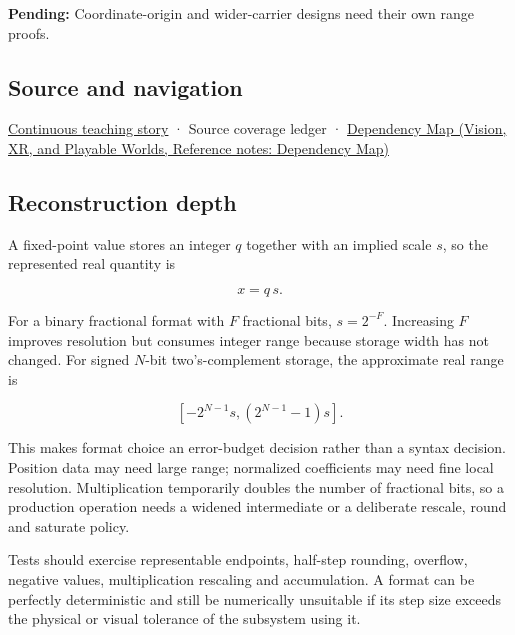 \textbf{Pending:} Coordinate-origin and wider-carrier designs need their own range proofs.

\subsection{Source and navigation}\label{appendix-ceb4c4a9b5a1-source-and-navigation}

\hyperref[01-foundations-i-ch001-choosing-what-information-to-keep]{Continuous teaching story} · {Source coverage ledger} · \href{../07-Vision-XR-and-Playable-Worlds/main.pdf\#nameddest=appendix-4ad47bdd269a}{Dependency Map (Vision, XR, and Playable Worlds, Reference notes: Dependency Map)}

\subsection{Reconstruction depth}\label{appendix-ceb4c4a9b5a1-reconstruction-depth}

A fixed-point value stores an integer \(q\) together with an implied scale \(s\), so the represented real quantity is

\[
x=q\,s.
\]

For a binary fractional format with \(F\) fractional bits, \(s=2^{-F}\). Increasing \(F\) improves resolution but consumes integer range because storage width has not changed. For signed \(N\)-bit two's-complement storage, the approximate real range is

\[
[-2^{N-1}s,(2^{N-1}-1)s].
\]

This makes format choice an error-budget decision rather than a syntax decision. Position data may need large range; normalized coefficients may need fine local resolution. Multiplication temporarily doubles the number of fractional bits, so a production operation needs a widened intermediate or a deliberate rescale, round and saturate policy.

Tests should exercise representable endpoints, half-step rounding, overflow, negative values, multiplication rescaling and accumulation. A format can be perfectly deterministic and still be numerically unsuitable if its step size exceeds the physical or visual tolerance of the subsystem using it.
